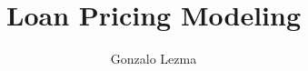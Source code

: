 \documentclass[12pt]{book}
\newenvironment{theorem}[2][Theorem]{\begin{trivlist}
\item[\hskip \labelsep {\bfseries #1}\hskip \labelsep {\bfseries #2.}]}{\end{trivlist}}
\begin{document}
 
 
\title{Loan Pricing Modeling }
\author{Gonzalo Lezma} %
\maketitle
 
 \tableofcontents
 \setcounter{tocdepth}{1}
 








\printbibliography


 
\end{document}
